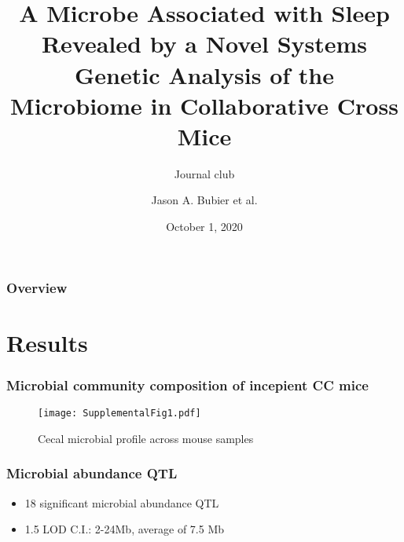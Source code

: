\documentclass{beamer}
\title{A Microbe Associated with Sleep Revealed by a Novel Systems Genetic Analysis of the Microbiome in Collaborative Cross Mice}
\subtitle{Journal club}
\author{Jason A. Bubier et al.}
\date{October 1, 2020}
\begin{document}
	\setcounter{showProgressBar}{0}
	\setcounter{showSlideNumbers}{0}

	\frame{\titlepage}

	\begin{frame}
		\frametitle{Overview}
		\begin{center}
		\end{center}
		
	\end{frame}

	\setcounter{framenumber}{0}
	\setcounter{showProgressBar}{1}
	\setcounter{showSlideNumbers}{1}
	\section{Results}
		\begin{frame}[b]
			\frametitle{Microbial community composition of incepient CC mice}
			\begin{figure}
			\centering
			\texttt{[image: SupplementalFig1.pdf]}
			\caption{Cecal microbial profile across mouse samples}
			\end{figure}
		\end{frame}

		\begin{frame}
			\frametitle{Microbial abundance QTL}
			\begin{itemize}
				\item 18 significant microbial abundance QTL
				\item 1.5 LOD C.I.: 2-24Mb, average of 7.5 Mb
			\end{itemize}
		\end{frame}
		
\end{document}

